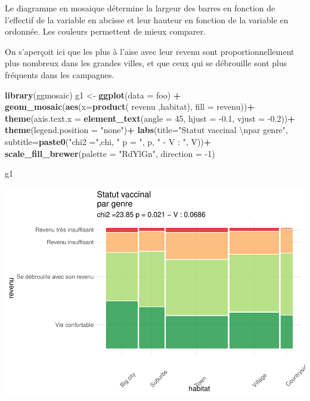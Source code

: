 \documentclass[
]{book}
\newenvironment{Shaded}{\begin{snugshade}}{\end{snugshade}}
\newcommand{\CharTok}[1]{\textcolor[rgb]{0.31,0.60,0.02}{#1}}
\newcommand{\DataTypeTok}[1]{\textcolor[rgb]{0.13,0.29,0.53}{#1}}
\newcommand{\DecValTok}[1]{\textcolor[rgb]{0.00,0.00,0.81}{#1}}
\newcommand{\FloatTok}[1]{\textcolor[rgb]{0.00,0.00,0.81}{#1}}
\newcommand{\KeywordTok}[1]{\textcolor[rgb]{0.13,0.29,0.53}{\textbf{#1}}}
\newcommand{\NormalTok}[1]{#1}
\newcommand{\OperatorTok}[1]{\textcolor[rgb]{0.81,0.36,0.00}{\textbf{#1}}}
\newcommand{\StringTok}[1]{\textcolor[rgb]{0.31,0.60,0.02}{#1}}
\begin{document}
Le diagramme en mosaique détermine la largeur des barres en fonction de l'effectif de la variable en abcisse et leur hauteur en fonction de la variable en ordonnée. Les couleurs permettent de mieux comparer.

On s'aperçoit ici que les plus à l'aise avec leur revenu sont proportionnellement plus nombreux dans les grandes villes, et que ceux qui se débrouille sont plus fréquents dans les campagnes.

\begin{Shaded}
\begin{Highlighting}[]
\KeywordTok{library}\NormalTok{(ggmosaic)}
\NormalTok{g1 <-}\StringTok{ }\KeywordTok{ggplot}\NormalTok{(}\DataTypeTok{data =}\NormalTok{ foo) }\OperatorTok{+}
\StringTok{  }\KeywordTok{geom_mosaic}\NormalTok{(}\KeywordTok{aes}\NormalTok{(}\DataTypeTok{x=}\KeywordTok{product}\NormalTok{( revenu ,habitat), }\DataTypeTok{fill =}\NormalTok{ revenu))}\OperatorTok{+}\StringTok{  }
\StringTok{  }\KeywordTok{theme}\NormalTok{(}\DataTypeTok{axis.text.x =} \KeywordTok{element_text}\NormalTok{(}\DataTypeTok{angle =} \DecValTok{45}\NormalTok{, }\DataTypeTok{hjust =} \FloatTok{-0.1}\NormalTok{, }\DataTypeTok{vjust =} \FloatTok{-0.2}\NormalTok{))}\OperatorTok{+}\StringTok{ }
\StringTok{  }\KeywordTok{theme}\NormalTok{(}\DataTypeTok{legend.position =} \StringTok{"none"}\NormalTok{)}\OperatorTok{+}
\StringTok{  }\KeywordTok{labs}\NormalTok{(}\DataTypeTok{title=}\StringTok{"Statut vaccinal }\CharTok{\textbackslash{}n}\StringTok{par genre"}\NormalTok{, }
       \DataTypeTok{subtitle=}\KeywordTok{paste0}\NormalTok{(}\StringTok{"chi2 ="}\NormalTok{,chi, }\StringTok{" p = "}\NormalTok{, p, }\StringTok{" - V : "}\NormalTok{, V))}\OperatorTok{+}\StringTok{    }
\StringTok{  }\KeywordTok{scale_fill_brewer}\NormalTok{(}\DataTypeTok{palette =} \StringTok{"RdYlGn"}\NormalTok{, }\DataTypeTok{direction =} \DecValTok{-1}\NormalTok{) }

\NormalTok{g1}
\end{Highlighting}
\end{Shaded}

\includegraphics{bookdown-demo_files/figure-latex/0428-1.pdf}
\end{document}
